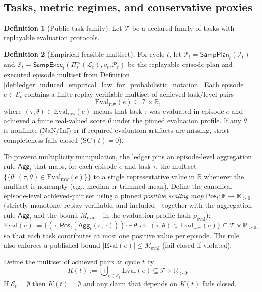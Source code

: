 \documentclass[11pt,a4paper]{article}
\newcommand{\R}{\mathbb{R}}
\newcommand{\mset}[1]{\{\!\{#1\}\!\}} %
\newcommand{\cI}{\mathcal{I}}
\newcommand{\cL}{\mathcal{L}}
\newcommand{\cT}{\mathcal{T}}
\theoremstyle{definition}
\newtheorem{definition}{Definition}
\theoremstyle{remark}
\begin{document}
\subsection{Tasks, metric regimes, and conservative proxies}
\begin{definition}[Public task family]\label{def:public_task_family}
Let $\cT$ be a declared family of tasks with replayable evaluation protocols.
\end{definition}

\begin{definition}[Empirical feasible multiset]\label{def:feasible_set}
For cycle $t$, let $\mathcal P_t=\mathsf{SampPlan}_t(\cI_t)$ and $\mathcal E_t=\mathsf{SampExec}_t(\Pi_s^{v_t}(\cL_t),v_t,\mathcal P_t)$ be the replayable episode plan and executed episode multiset from Definition \ref{def:ledger_induced_empirical_law_for_probabilistic_notation}.
Each episode $e\in\mathcal E_t$ contains a finite replay-verifiable multiset of achieved task/level pairs
\[
\mathrm{Eval}_{\mathrm{raw}}(e)\subseteq \cT\times\R,
\]
where $(\tau,\theta)\in \mathrm{Eval}_{\mathrm{raw}}(e)$ means that task $\tau$ was evaluated in episode $e$ and achieved a finite real-valued score $\theta$ under the pinned evaluation profile.
If any $\theta$ is nonfinite (NaN/Inf) or if required evaluation artifacts are missing, strict completeness fails closed ($\mathrm{SC}(t)=0$).

To prevent multiplicity manipulation, the ledger pins an episode-level aggregation rule $\mathsf{Agg}_t$ that maps, for each episode $e$ and task $\tau$,
the multiset $\mset{\theta:(\tau,\theta)\in \mathrm{Eval}_{\mathrm{raw}}(e)}$ to a single representative value in $\R$ whenever the multiset is nonempty (e.g., median or trimmed mean).
Define the canonical episode-level achieved-pair set using a pinned \emph{positive scaling map} $\mathsf{Pos}_t:\R\to\R_{>0}$ (strictly monotone, replay-verifiable, and included---together with the aggregation rule $\mathsf{Agg}_t$ and the bound $M_{\mathrm{eval}}$---in the evaluation-profile hash $\rho_{\mathrm{eval}}$):
\[
\mathrm{Eval}(e):=\{(\tau,\mathsf{Pos}_t(\mathsf{Agg}_t(e,\tau))):\exists\,\theta\ \text{s.t. }(\tau,\theta)\in \mathrm{Eval}_{\mathrm{raw}}(e)\}\subseteq \cT\times\R_{>0},
\]
so that each task contributes at most one positive value per episode.
The rule also enforces a published bound $|\mathrm{Eval}(e)|\le M_{\mathrm{eval}}$ (fail closed if violated).

Define the multiset of achieved pairs at cycle $t$ by
\[
K(t):=\biguplus_{e\in\mathcal E_t}\mathrm{Eval}(e)\subseteq \cT\times\R_{>0}.
\]
If $\mathcal E_t=\emptyset$ then $K(t)=\emptyset$ and any claim that depends on $K(t)$ fails closed.
\end{definition}
\end{document}
